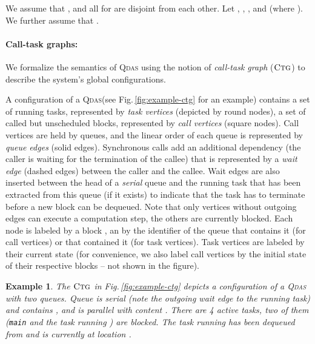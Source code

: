 \documentclass[runningheads,oribibl,]{article}
\newcommand{\qdas}{\textsc{Qdas}\xspace}
\newcommand{\ctg}{\ensuremath{\textsc{Ctg}}\xspace}
\def\eor{\ifmmode\squareforqed\else{\unskip\nobreak\hfil
\penalty50\hskip1em\null\nobreak\hfil
\parfillskip=0pt\finalhyphendemerits=0\endgraf}\fi}
\newtheorem{example}{Example}{}
\begin{document}
We assume that , and all  for
 are disjoint from each other. Let
,
,
, and
 (where ).
We further assume that .

\paragraph{\bf Call-task graphs:}
We formalize the semantics of \qdas using the notion of
\emph{call-task graph} (\ctg) to describe the system's global
configurations.

A configuration of a \qdas (see Fig.\,\ref{fig:example-ctg} for an
example) contains a set of running tasks, represented by \emph{task
  vertices} (depicted by round nodes), a set of called but unscheduled
blocks, represented by \emph{call vertices} (square nodes). Call
vertices are held by queues, and the linear order of each queue is
represented by \emph{queue edges} (solid edges). Synchronous calls add
an additional dependency (the caller is waiting for the termination of
the callee) that is represented by a \emph{wait edge} (dashed edges)
between the caller and the callee. Wait edges are also inserted
between the head of a \emph{serial} queue and the running task that
has been extracted from this queue (if it exists) to indicate that the
task has to terminate before a new block can be dequeued.  Note that
only vertices without outgoing edges can execute a computation step,
the others are currently blocked.  Each node  is labeled by a block
, an by the identifier  of the queue that
contains it (for call vertices) or that contained it (for task
vertices). Task vertices are labeled by their current state
 (for convenience, we also label call vertices by the
initial state of their respective blocks -- not shown in the figure).



\vspace{-1ex}
\begin{example}
  The \ctg in Fig.\,\ref{fig:example-ctg} depicts a configuration of a
  \qdas with two queues. Queue  is serial (note the outgoing wait
  edge to the running task) and contains ,
  and  is parallel with content . There are 4
  active tasks, two of them (\texttt{main} and the task running
  ) are blocked. The task running  has been
  dequeued from  and is currently at location . \eor
\end{example}
\vspace{-1ex}
\end{document}
